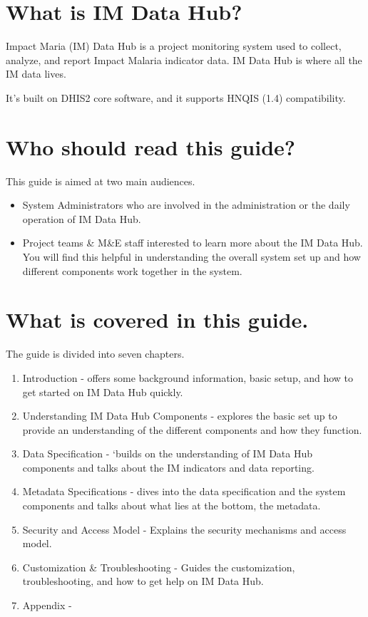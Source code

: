 \documentclass[]{book}
\providecommand{\tightlist}{%
  \setlength{\itemsep}{0pt}\setlength{\parskip}{0pt}}
\begin{document}
\hypertarget{what-is-im-data-hub}{%
\section{What is IM Data Hub?}\label{what-is-im-data-hub}}

Impact Maria (IM) Data Hub is a project monitoring system used to collect, analyze, and report Impact Malaria indicator data. IM Data Hub is where all the IM data lives.

It's built on DHIS2 core software, and it supports HNQIS (1.4) compatibility.

\hypertarget{who-should-read-this-guide}{%
\section{Who should read this guide?}\label{who-should-read-this-guide}}

This guide is aimed at two main audiences.

\begin{itemize}
\tightlist
\item
  System Administrators who are involved in the administration or the daily operation of IM Data Hub.
\item
  Project teams \& M\&E staff interested to learn more about the IM Data Hub. You will find this helpful in understanding the overall system set up and how different components work together in the system.
\end{itemize}

\hypertarget{what-is-covered-in-this-guide.}{%
\section{What is covered in this guide.}\label{what-is-covered-in-this-guide.}}

The guide is divided into seven chapters.

\begin{enumerate}
\def\labelenumi{\arabic{enumi}.}
\tightlist
\item
  Introduction - offers some background information, basic setup, and how to get started on IM Data Hub quickly.
\item
  Understanding IM Data Hub Components - explores the basic set up to provide an understanding of the different components and how they function.
\item
  Data Specification - `builds on the understanding of IM Data Hub components and talks about the IM indicators and data reporting.
\item
  Metadata Specifications - dives into the data specification and the system components and talks about what lies at the bottom, the metadata.
\item
  Security and Access Model - Explains the security mechanisms and access model.
\item
  Customization \& Troubleshooting - Guides the customization, troubleshooting, and how to get help on IM Data Hub.
\item
  Appendix -
\end{enumerate}
\end{document}
